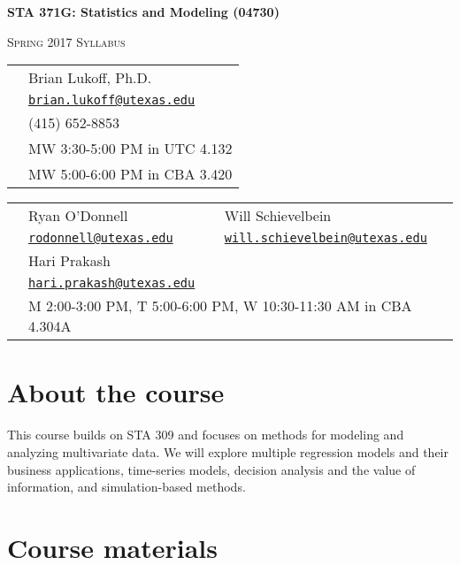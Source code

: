 \documentclass[12pt]{article}
\begin{document}
\pagestyle{fancy}
\thispagestyle{empty}

\begin{center}
\textbf{\Large STA 371G: Statistics and Modeling (04730)}

\textsc{\large Spring 2017 Syllabus}

\bigskip

\begin{tabular}{rl}
\noindent {\bf Instructor:} & Brian Lukoff, Ph.D. \\
\noindent {\bf Email:} & \href{mailto:brian.lukoff@utexas.edu}{\tt brian.lukoff@utexas.edu} \\
\noindent {\bf Phone:} & (415) 652-8853 \\
\noindent {\bf Class Meetings:} & MW 3:30-5:00 PM in UTC 4.132 \\
\noindent {\bf Office Hours:} & MW 5:00-6:00 PM in CBA 3.420 \\
\end{tabular}

\begin{tabular}{rll}
\noindent {\bf TA:} & Ryan O'Donnell & Will Schievelbein \\
\noindent {\bf Email:} & \href{mailto:rodonnell@utexas.edu}{\tt rodonnell@utexas.edu} & \href{mailto:will.schievelbein@utexas.edu}{\tt  will.schievelbein@utexas.edu} \\
\noindent {\bf TA:} & Hari Prakash \\
\noindent {\bf Email:} & \href{mailto:hari.prakash@utexas.edu}{\tt hari.prakash@utexas.edu} \\
\noindent {\bf Office Hours:} & \multicolumn{2}{l}{M 2:00-3:00 PM, T 5:00-6:00 PM, W 10:30-11:30 AM in CBA 4.304A}  \\
\end{tabular}

\end{center}

\section*{About the course}

This course builds on STA 309 and focuses on methods for modeling and analyzing multivariate data.  We will explore multiple regression models and their business applications, time-series models, decision analysis and the value of information, and simulation-based methods.

\section*{Course materials}
\end{document}
